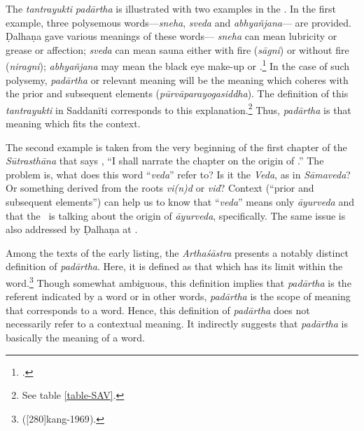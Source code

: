 The \emph{tantrayukti} \emph{padārtha} is illustrated with two examples in the \SS. In the first example, three polysemous words---\emph{sneha}, \emph{sveda} and \emph{abhyañjana}— are provided. Ḍalhaṇa gave various meanings of these words--- \emph{sneha} can mean lubricity or grease or affection; \emph{sveda} can mean sauna either with fire (\emph{sāgni}) or without fire (\emph{niragni}); \emph{abhyañjana} may mean the black eye make-up or .\footnote{ .} 
In the case of such polysemy, \emph{padārtha} or relevant meaning will be the meaning which coheres with the prior and subsequent elements (\emph{pūrvāparayogasiddha}). The definition of this \emph{tantrayukti} in Saddanīti corresponds to this explanation.\footnote{See table \ref{table-SAV}.} Thus, \emph{padārtha} is that meaning which fits the context.   

The second example is taken from the very beginning of the first chapter of 
the \emph{Sūtrasthāna} that says , 
“I shall narrate the chapter on the origin of .” 
The problem is, what does this word “\emph{veda}” refer to?  
Is it the \emph{Veda}, as in \emph{Sāmaveda}?  Or
something derived from the roots \root \emph{vi(n)d} or \root \emph{vid}?  
Context (“prior and subsequent elements”) can help us to know that “\emph{veda}”
means only \emph{āyurveda} and that the \SS\ is talking about the
origin of \emph{āyurveda}, specifically.  
The same issue is also addressed by Ḍalhaṇa at .

Among the texts of the early listing, 
the \emph{Arthaśāstra} presents a notably distinct definition of \emph{padārtha}. 
Here, it is defined as that which has its limit within the word.\footnote{
	 ([280]{kang-1969}).}
Though somewhat ambiguous, this definition implies 
that \emph{padārtha} is the referent indicated by a word or in other words, \emph{padārtha} is the scope of meaning that corresponds to a word. 
Hence, this definition of \emph{padārtha} does not necessarily refer to a contextual meaning. 
It indirectly suggests that \emph{padārtha} is basically the meaning of a word. 

